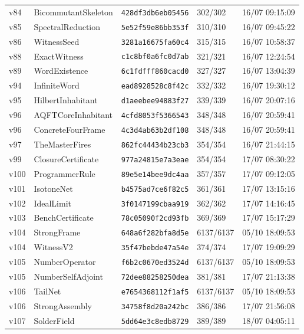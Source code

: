 \documentclass[11pt]{article}
\theoremstyle{definition}\newtheorem{deriv}{Derivation}
\begin{document}
{\begin{longtable}{@{}lllll@{}}
v84 & BicommutantSkeleton & \texttt{428df3db6eb05456} & 302/302 & 16/07 09:15:09 \\
v85 & SpectralReduction & \texttt{5e52f59e86bb353f} & 310/310 & 16/07 09:45:22 \\
v86 & WitnessSeed & \texttt{3281a16675fa60c4} & 315/315 & 16/07 10:58:37 \\
v88 & ExactWitness & \texttt{c1c8bf0a6fc0d7ab} & 321/321 & 16/07 12:24:54 \\
v89 & WordExistence & \texttt{6c1fdfff860cacd0} & 327/327 & 16/07 13:04:39 \\
v94 & InfiniteWord & \texttt{ead8928528c8f42c} & 332/332 & 16/07 19:30:12 \\
v95 & HilbertInhabitant & \texttt{d1aeebee94883f27} & 339/339 & 16/07 20:07:16 \\
v96 & AQFTCoreInhabitant & \texttt{4cfd8053f5366543} & 348/348 & 16/07 20:59:41 \\
v96 & ConcreteFourFrame & \texttt{4c3d4ab63b2df108} & 348/348 & 16/07 20:59:41 \\
v97 & TheMasterFires & \texttt{862fc44434b23cb3} & 354/354 & 16/07 21:44:15 \\
v99 & ClosureCertificate & \texttt{977a24815e7a3eae} & 354/354 & 17/07 08:30:22 \\
v100 & ProgrammerRule & \texttt{89e5e14bee9dc4aa} & 357/357 & 17/07 09:12:05 \\
v101 & IsotoneNet & \texttt{b4575ad7ce6f82c5} & 361/361 & 17/07 13:15:16 \\
v102 & IdealLimit & \texttt{3f0147199cbaa919} & 362/362 & 17/07 14:16:45 \\
v103 & BenchCertificate & \texttt{78c05090f2cd93fb} & 369/369 & 17/07 15:17:29 \\
v104 & StrongFrame & \texttt{648a6f282bfa8d5e} & 6137/6137 & 05/10 18:09:53 \\
v104 & WitnessV2 & \texttt{35f47bebde47a54e} & 374/374 & 17/07 19:09:29 \\
v105 & NumberOperator & \texttt{f6b2c0670ed3524d} & 6137/6137 & 05/10 18:09:53 \\
v105 & NumberSelfAdjoint & \texttt{72dee88258250dea} & 381/381 & 17/07 21:13:38 \\
v106 & TailNet & \texttt{e7654368112f1af5} & 6137/6137 & 05/10 18:09:53 \\
v106 & StrongAssembly & \texttt{34758f8d20a242bc} & 386/386 & 17/07 21:56:08 \\
v107 & SolderField & \texttt{5dd64e3c8edb8729} & 389/389 & 18/07 04:05:11 \\

\end{longtable}}
\end{document}
